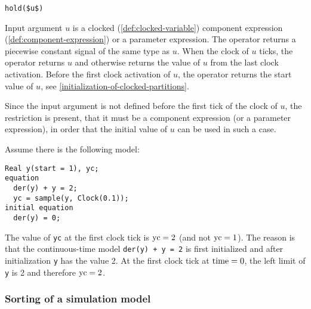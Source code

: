 \begin{operatordefinition}[hold]
\begin{synopsis}\begin{lstlisting}
hold($u$)
\end{lstlisting}\end{synopsis}
\begin{semantics}
Input argument $u$ is a clocked (\cref{def:clocked-variable}) component expression (\cref{def:component-expression}) or a parameter expression.
The operator returns a piecewise constant signal of the same type as $u$.
When the clock of $u$ ticks, the operator returns $u$ and otherwise returns the value of $u$ from the last clock activation.
Before the first clock activation of $u$, the operator returns the start value of $u$, see \cref{initialization-of-clocked-partitions}.
\begin{nonnormative}
Since the input argument is not defined before the first tick of the clock of $u$, the restriction is present, that it must be a component expression (or a parameter expression), in order that the initial value of $u$ can be used in such a case.
\end{nonnormative}
\end{semantics}
\end{operatordefinition}

\begin{example}
Assume there is the following model:
\begin{lstlisting}[language=modelica]
  Real y(start = 1), yc;
equation
  der(y) + y = 2;
  yc = sample(y, Clock(0.1));
initial equation
  der(y) = 0;
\end{lstlisting}

The value of \lstinline!yc! at the first clock tick is $\text{\lstinline!yc!} = 2$ (and not $\text{\lstinline!yc!} = 1$).  The reason is that the continuous-time model \lstinline!der(y) + y = 2! is first initialized and after initialization \lstinline!y! has the value 2.  At the first clock tick at $\text{\lstinline!time!} = 0$, the left limit of \lstinline!y! is 2 and therefore $\text{\lstinline!yc!} = 2$.
\end{example}

\subsubsection{Sorting of a simulation model}

